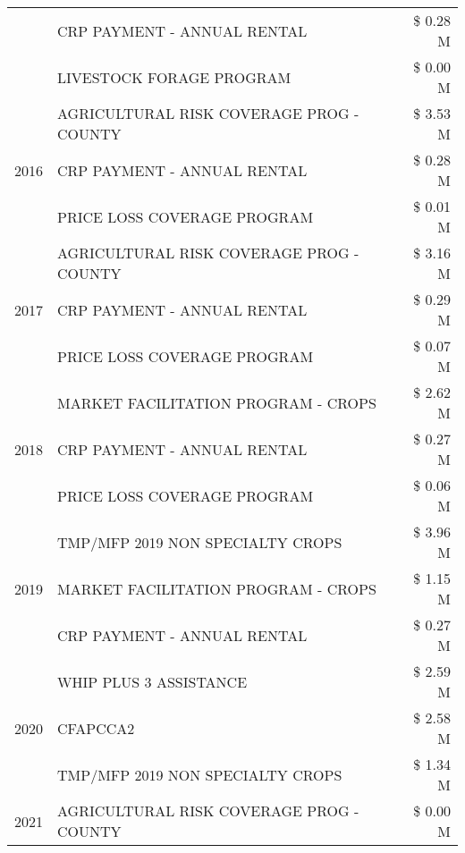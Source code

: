 \begin{tabular}{llr}
 & CRP PAYMENT - ANNUAL RENTAL & \$ 0.28 M \\
 & LIVESTOCK FORAGE PROGRAM & \$ 0.00 M \\
\cline{1-3}
\multirow[t]{3}{*}{2016} & AGRICULTURAL RISK COVERAGE PROG - COUNTY      & \$ 3.53 M \\
 & CRP PAYMENT - ANNUAL RENTAL                   & \$ 0.28 M \\
 & PRICE LOSS COVERAGE PROGRAM                   & \$ 0.01 M \\
\cline{1-3}
\multirow[t]{3}{*}{2017} & AGRICULTURAL RISK COVERAGE PROG - COUNTY & \$ 3.16 M \\
 & CRP PAYMENT - ANNUAL RENTAL & \$ 0.29 M \\
 & PRICE LOSS COVERAGE PROGRAM & \$ 0.07 M \\
\cline{1-3}
\multirow[t]{3}{*}{2018} & MARKET FACILITATION PROGRAM - CROPS & \$ 2.62 M \\
 & CRP PAYMENT - ANNUAL RENTAL & \$ 0.27 M \\
 & PRICE LOSS COVERAGE PROGRAM & \$ 0.06 M \\
\cline{1-3}
\multirow[t]{3}{*}{2019} & TMP/MFP 2019 NON SPECIALTY CROPS & \$ 3.96 M \\
 & MARKET FACILITATION PROGRAM - CROPS & \$ 1.15 M \\
 & CRP PAYMENT - ANNUAL RENTAL & \$ 0.27 M \\
\cline{1-3}
\multirow[t]{3}{*}{2020} & WHIP PLUS 3 ASSISTANCE & \$ 2.59 M \\
 & CFAPCCA2 & \$ 2.58 M \\
 & TMP/MFP 2019 NON SPECIALTY CROPS & \$ 1.34 M \\
\cline{1-3}
2021 & AGRICULTURAL RISK COVERAGE PROG - COUNTY & \$ 0.00 M \\
\cline{1-3}
\bottomrule
\end{tabular}
